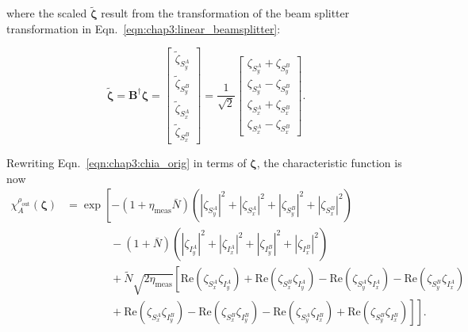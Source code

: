 \documentclass[aps,twocolumn,secnumarabic,amsmath,amssymb,pra,groupedaddress,
showpacs, showkeys]{revtex4-1}
\newcommand{\pna}[1]{\left(#1\right)}
\newcommand{\eqn}[1]{
\begin{equation}
	#1
\end{equation}
}
\begin{document}
where the scaled $\tilde{\bm{\zeta}}$ result from the transformation of the
beam splitter transformation in Eqn.~\ref{eqn:chap3:linear_beamsplitter}:
\eqn{
\tilde{\bm{\zeta}}=\mathbf{B}^{\dagger}\bm{\zeta}=\left[
\begin{array}{c}
	\tilde{\zeta}_{S_y^A} \\
	\tilde{\zeta}_{S_y^B} \\
	\tilde{\zeta}_{S_x^A} \\
	\tilde{\zeta}_{S_x^B}
\end{array}
\right]=\frac{1}{\sqrt{2}}
\left[
\begin{array}{c}
	\zeta_{S_y^A} + \zeta_{S_y^B} \\
	\zeta_{S_y^A} - \zeta_{S_y^B} \\
	\zeta_{S_x^A} + \zeta_{S_x^B}\\
	\zeta_{S_x^A} - \zeta_{S_x^B}
\end{array}
\right].\label{eq:scaled_vars}
}
Rewriting Eqn.~\ref{eqn:chap3:chia_orig} in terms of $\bm{\zeta}$, the
characteristic function is now
\begin{align}
    \chi_A^{\rho_{\textrm{out}}}\pna{\bm{\zeta}} 
    & = \exp\left[-\pna{1+\eta_{\textrm{meas}}\bar{N}}\pna{|\zeta_{S_y^A}|^2+|\zeta_{S_x^A}|^2+|\zeta_{S_y^B}|^2+|\zeta_{S_x^B}|^2} \right.\nonumber \\
    & \qquad \qquad \left.{}-\pna{1+\bar{N}}\pna{|\zeta_{I_y^A}|^2+|\zeta_{I_x^A}|^2+|\zeta_{I_y^B}|^2+|\zeta_{I_x^B}|^2}\right.\nonumber \\ 
    & \qquad \qquad \left. {} +\tilde{N}\sqrt{2\eta_{\textrm{meas}}}\left[
    \textrm{Re}\pna{\zeta_{S_x^A} \zeta_{I_y^A}}
    +\textrm{Re}\pna{\zeta_{S_x^B}\zeta_{I_y^A}}
    -\textrm{Re}\pna{\zeta_{S_y^A}\zeta_{I_x^A}}
    -\textrm{Re}\pna{\zeta_{S_y^B} \zeta_{I_x^A}}\right.\right.\nonumber \\
    & \qquad \qquad \left.\left. {} 
    +\textrm{Re}\pna{\zeta_{S_x^A}\zeta_{I_y^B}}
    -\textrm{Re}\pna{\zeta_{S_x^B}\zeta_{I_y^B}}
    -\textrm{Re}\pna{\zeta_{S_y^A}\zeta_{I_x^B}}
    +\textrm{Re}\pna{\zeta_{S_y^B} \zeta_{I_x^B}}\right]\right].
    \label{eq:char_final}
\end{align}
\end{document}

